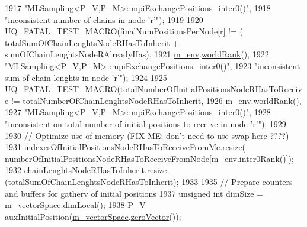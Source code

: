 \begin{DoxyCode}
1917                         \textcolor{stringliteral}{"MLSampling<P\_V,P\_M>::mpiExchangePositions\_inter0()"},
1918                         \textcolor{stringliteral}{"inconsistent number of chains in node 'r'"});
1919 
1920     \hyperlink{_defines_8h_a56d63d18d0a6d45757de47fcc06f574d}{UQ\_FATAL\_TEST\_MACRO}(finalNumPositionsPerNode[r] != (
      totalSumOfChainLenghtsNodeRHasToInherit + sumOfChainLenghtsNodeRAlreadyHas),
1921                         \hyperlink{class_q_u_e_s_o_1_1_m_l_sampling_a13f1ca4fe9f94822fe572a743eaced1d}{m\_env}.\hyperlink{class_q_u_e_s_o_1_1_base_environment_a78b57112bbd0e6dd0e8afec00b40ffa7}{worldRank}(),
1922                         \textcolor{stringliteral}{"MLSampling<P\_V,P\_M>::mpiExchangePositions\_inter0()"},
1923                         \textcolor{stringliteral}{"inconsistent sum of chain lenghts in node 'r'"});
1924 
1925     \hyperlink{_defines_8h_a56d63d18d0a6d45757de47fcc06f574d}{UQ\_FATAL\_TEST\_MACRO}(totalNumberOfInitialPositionsNodeRHasToReceive != 
      totalNumberOfChainLenghtsNodeRHasToInherit,
1926                         \hyperlink{class_q_u_e_s_o_1_1_m_l_sampling_a13f1ca4fe9f94822fe572a743eaced1d}{m\_env}.\hyperlink{class_q_u_e_s_o_1_1_base_environment_a78b57112bbd0e6dd0e8afec00b40ffa7}{worldRank}(),
1927                         \textcolor{stringliteral}{"MLSampling<P\_V,P\_M>::mpiExchangePositions\_inter0()"},
1928                         \textcolor{stringliteral}{"inconsistent on total number of initial positions to receive in node 'r'"});
1929 
1930     \textcolor{comment}{// Optimize use of memory (FIX ME: don't need to use swap here ????)}
1931     indexesOfInitialPositionsNodeRHasToReceiveFromMe.resize(
      numberOfInitialPositionsNodeRHasToReceiveFromNode[\hyperlink{class_q_u_e_s_o_1_1_m_l_sampling_a13f1ca4fe9f94822fe572a743eaced1d}{m\_env}.\hyperlink{class_q_u_e_s_o_1_1_base_environment_ae106b5bb8a80b655b88b3a26b1e7c185}{inter0Rank}()]);
1932     chainLenghtsNodeRHasToInherit.resize                   (totalSumOfChainLenghtsNodeRHasToInherit);
1933 
1935     \textcolor{comment}{// Prepare counters and buffers for gatherv of initial positions}
1937 \textcolor{comment}{}    \textcolor{keywordtype}{unsigned} \textcolor{keywordtype}{int} dimSize = \hyperlink{class_q_u_e_s_o_1_1_m_l_sampling_a7bc4c72f65ba9166ed94a6e198b0915b}{m\_vectorSpace}.\hyperlink{class_q_u_e_s_o_1_1_vector_space_a5829a1f4f996f8307c840b705144d666}{dimLocal}();
1938     P\_V auxInitialPosition(\hyperlink{class_q_u_e_s_o_1_1_m_l_sampling_a7bc4c72f65ba9166ed94a6e198b0915b}{m\_vectorSpace}.\hyperlink{class_q_u_e_s_o_1_1_vector_space_a92e963bb5cab3eecd290dfe4b8f03b04}{zeroVector}());

\end{DoxyCode}

